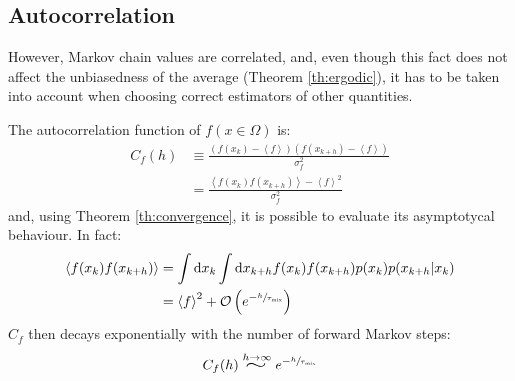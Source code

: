 \subsection*{Autocorrelation}
However, Markov chain values are correlated,
and, even though this fact does not affect the unbiasedness of the average (Theorem \ref{th:ergodic}),
it has to be taken into account when choosing correct estimators of other quantities.%

The autocorrelation function of $f(x\in\Omega)$ is:
\begin{align*}
    C_f(h) &\equiv \frac{(f(x_k)-\left<f\right>)(f(x_{k+h})-\left<f\right>)}{\sigma_f^2} \\
           &= \frac{\left<f(x_k)f(x_{k+h})\right>-\left<f\right>^2}{\sigma_f^2}
\end{align*}
and, using Theorem \ref{th:convergence}, it is possible to evaluate its asymptotycal behaviour.
In fact:
\begin{align*}
    \left<f(x_k)f(x_{k+h})\right> &= \int\mathrm dx_k\int\mathrm dx_{k+h}f(x_k)f(x_{k+h})p(x_k)p(x_{k+h}|x_k) \\
                                  &= \left<f\right>^2 + \mathcal O\left(e^{-\sfrac{h}{\tau_\mathrm{mix}}}\right)
\end{align*}
$C_f$ then decays exponentially with the number of forward Markov steps:
\begin{equation}\label{eq:autocorr_decay}
    C_f(h) \stackrel{h\to\infty}{\scalebox{2}[1.25]{$\sim$}} e^{-\sfrac{h}{\tau_\mathrm{mix}}}
\end{equation}

